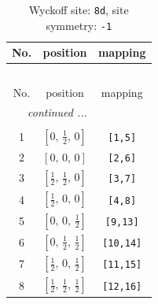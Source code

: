 \documentclass[fleqn,8pt]{jsarticle}
\begin{document}
\begin{longtable}{ccc}
\caption{Wyckoff site: {\tt 8d}, site symmetry: {\tt -1}}
 \\
 \hline \hline
No. & position & mapping \\ \hline \endfirsthead

\multicolumn{2}{l}{\tablename\ \thetable{}} \\
 \hline \hline
No. & position & mapping \\ \hline \endhead

 \hline \hline
\multicolumn{2}{r}{\footnotesize\it continued ...} \\ \endfoot

 \hline \hline
\multicolumn{2}{r}{} \\ \endlastfoot

1 & $\left[ 0,\, \frac{1}{2},\, 0 \right]$ & {\tt [1,5]} \\ \hline
2 & $\left[ 0,\, 0,\, 0 \right]$ & {\tt [2,6]} \\ \hline
3 & $\left[ \frac{1}{2},\, \frac{1}{2},\, 0 \right]$ & {\tt [3,7]} \\ \hline
4 & $\left[ \frac{1}{2},\, 0,\, 0 \right]$ & {\tt [4,8]} \\ \hline
5 & $\left[ 0,\, 0,\, \frac{1}{2} \right]$ & {\tt [9,13]} \\ \hline
6 & $\left[ 0,\, \frac{1}{2},\, \frac{1}{2} \right]$ & {\tt [10,14]} \\ \hline
7 & $\left[ \frac{1}{2},\, 0,\, \frac{1}{2} \right]$ & {\tt [11,15]} \\ \hline
8 & $\left[ \frac{1}{2},\, \frac{1}{2},\, \frac{1}{2} \right]$ & {\tt [12,16]} \\
\end{longtable}
\renewcommand{\arraystretch}{1.2}
\end{document}
